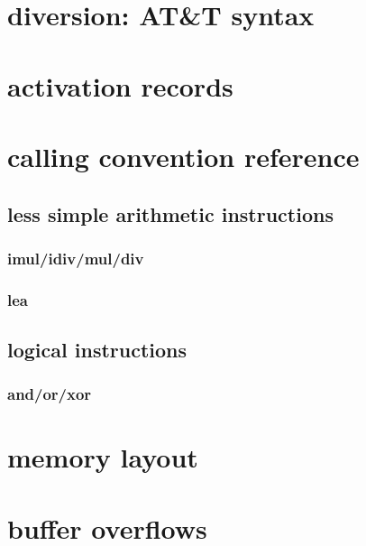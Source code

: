 \section{diversion: AT&T syntax}



\section{activation records}


\section{calling convention reference}



\subsection{less simple arithmetic instructions}

\subsubsection{imul/idiv/mul/div}



\subsubsection{lea}




\subsection{logical instructions}

\subsubsection{and/or/xor}




\section{memory layout}



\section{buffer overflows}


